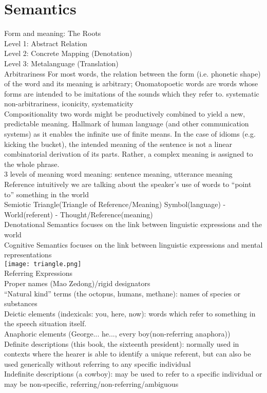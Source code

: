\section{Semantics}
\scriptsize{Form and meaning: The Roots} \\
{\tiny Level 1: Abstract Relation\\
Level 2: Concrete Mapping (Denotation)\\
Level 3: Metalanguage (Translation)
}\\
\scriptsize{Arbitrariness} {\tiny For most words, the relation between the form (i.e. phonetic shape) of the word and its meaning is arbitrary; Onomatopoetic words are words whose forms are intended to be imitations of the sounds which they refer to. systematic non-arbitrariness, iconicity, systematicity}\\
\scriptsize{Compositionality} {\tiny two words might be productively combined to yield a new, predictable meaning. Hallmark of human language (and other communication systems) as it enables the infinite use of finite means. In the case of idioms (e.g. kicking the bucket), the intended meaning of the sentence is not a linear combinatorial derivation of its parts. Rather, a complex meaning is assigned to the whole phrase.}\\
\scriptsize{3 levels of meaning} {\tiny word meaning: sentence meaning, utterance meaning}\\
\scriptsize{Reference} {\tiny intuitively we are talking about the speaker’s use of words to “point to” something in the world}\\
\scriptsize{Semiotic Triangle(Triangle of Reference/Meaning)} {\tiny Symbol(language) - World(referent) - Thought/Reference(meaning)}\\
\scriptsize{Denotational Semantics} {\tiny focuses on the link between linguistic expressions and the world}\\
\scriptsize{Cognitive Semantics} {\tiny focuses on the link between linguistic expressions and mental representations}\\
\texttt{[image: triangle.png]}\\
\scriptsize{Referring Expressions}\\ {\tiny Proper names (Mao Zedong)/rigid designators\\
“Natural kind” terms (the octopus, humans, methane): names of species or substances\\
Deictic elements (indexicals: you, here, now): words which refer to something in the speech situation itself.\\
Anaphoric elements (George... he..., every boy(non-referring anaphora))\\
Definite descriptions (this book, the sixteenth president): normally used in contexts where the hearer is able to identify a unique referent, but can also be used generically without referring to any specific individual \\
Indefinite descriptions (a cowboy): may be used to refer to a specific individual or may be non-specific, referring/non-referring/ambiguous
}\\
